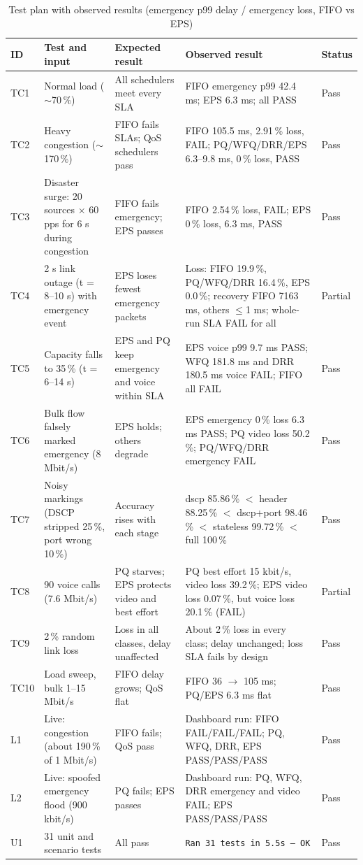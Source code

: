 \documentclass[12pt,a4paper]{article}
\begin{document}
\begin{table}[H]\centering\scriptsize
\caption{Test plan with observed results (emergency p99 delay / emergency loss, FIFO vs EPS)}\label{tab:tests}
\begin{tabularx}{\textwidth}{|l|p{3.1cm}|X|X|l|}\hline
\textbf{ID} & \textbf{Test and input} & \textbf{Expected result} & \textbf{Observed result} & \textbf{Status}\\\hline
TC1 & Normal load ($\sim$70\,\%) & All schedulers meet every SLA & FIFO emergency p99 42.4 ms; EPS 6.3 ms; all PASS & Pass\\\hline
TC2 & Heavy congestion ($\sim$170\,\%) & FIFO fails SLAs; QoS schedulers pass & FIFO 105.5 ms, 2.91\,\% loss, FAIL; PQ/WFQ/DRR/EPS 6.3--9.8 ms, 0\,\% loss, PASS & Pass\\\hline
TC3 & Disaster surge: 20 sources $\times$ 60 pps for 6 s during congestion & FIFO fails emergency; EPS passes & FIFO 2.54\,\% loss, FAIL; EPS 0\,\% loss, 6.3 ms, PASS & Pass\\\hline
TC4 & 2 s link outage (t = 8--10 s) with emergency event & EPS loses fewest emergency packets & Loss: FIFO 19.9\,\%, PQ/WFQ/DRR 16.4\,\%, EPS 0.0\,\%; recovery FIFO 7163 ms, others $\le$1 ms; whole-run SLA FAIL for all & Partial\\\hline
TC5 & Capacity falls to 35\,\% (t = 6--14 s) & EPS and PQ keep emergency and voice within SLA & EPS voice p99 9.7 ms PASS; WFQ 181.8 ms and DRR 180.5 ms voice FAIL; FIFO all FAIL & Pass\\\hline
TC6 & Bulk flow falsely marked emergency (8 Mbit/s) & EPS holds; others degrade & EPS emergency 0\,\% loss 6.3 ms PASS; PQ video loss 50.2\,\%; PQ/WFQ/DRR emergency FAIL & Pass\\\hline
TC7 & Noisy markings (DSCP stripped 25\,\%, port wrong 10\,\%) & Accuracy rises with each stage & dscp 85.86\,\% $<$ header 88.25\,\% $<$ dscp+port 98.46\,\% $<$ stateless 99.72\,\% $<$ full 100\,\% & Pass\\\hline
TC8 & 90 voice calls (7.6 Mbit/s) & PQ starves; EPS protects video and best effort & PQ best effort 15 kbit/s, video loss 39.2\,\%; EPS video loss 0.07\,\%, but voice loss 20.1\,\% (FAIL) & Partial\\\hline
TC9 & 2\,\% random link loss & Loss in all classes, delay unaffected & About 2\,\% loss in every class; delay unchanged; loss SLA fails by design & Pass\\\hline
TC10 & Load sweep, bulk 1--15 Mbit/s & FIFO delay grows; QoS flat & FIFO 36 $\rightarrow$ 105 ms; PQ/EPS 6.3 ms flat & Pass\\\hline
L1 & Live: congestion (about 190\,\% of 1 Mbit/s) & FIFO fails; QoS pass & Dashboard run: FIFO FAIL/FAIL/FAIL; PQ, WFQ, DRR, EPS PASS/PASS/PASS & Pass\\\hline
L2 & Live: spoofed emergency flood (900 kbit/s) & PQ fails; EPS passes & Dashboard run: PQ, WFQ, DRR emergency and video FAIL; EPS PASS/PASS/PASS & Pass\\\hline
U1 & 31 unit and scenario tests & All pass & \texttt{Ran 31 tests in 5.5s -- OK} & Pass\\\hline
\end{tabularx}
\end{table}
\end{document}
